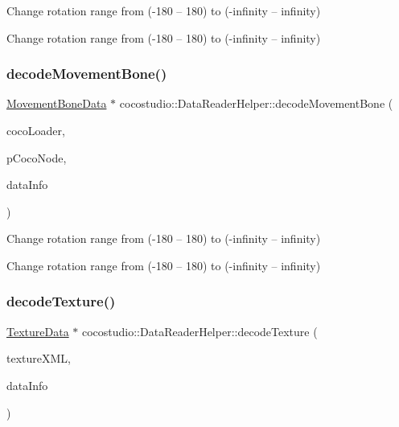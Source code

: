Change rotation range from (-\/180 -- 180) to (-\/infinity -- infinity)

Change rotation range from (-\/180 -- 180) to (-\/infinity -- infinity) \mbox{\label{classcocostudio_1_1DataReaderHelper_a66a4cce95a6b7cfbc4cbf89a962829c0}} 
\subsubsection{\texorpdfstring{decode\+Movement\+Bone()}{decodeMovementBone()}\hspace{0.1cm}{\footnotesize\ttfamily [3/3]}}
{\footnotesize\ttfamily \hyperlink{classcocostudio_1_1MovementBoneData}{Movement\+Bone\+Data} $\ast$ cocostudio\+::\+Data\+Reader\+Helper\+::decode\+Movement\+Bone (\begin{DoxyParamCaption}\item[{\hyperlink{classcocostudio_1_1CocoLoader}{Coco\+Loader} $\ast$}]{coco\+Loader,  }\item[{\hyperlink{structcocostudio_1_1stExpCocoNode}{st\+Exp\+Coco\+Node} $\ast$}]{p\+Coco\+Node,  }\item[{\hyperlink{structcocostudio_1_1DataReaderHelper_1_1__DataInfo}{Data\+Info} $\ast$}]{data\+Info }\end{DoxyParamCaption})\hspace{0.3cm}{\ttfamily [static]}}

Change rotation range from (-\/180 -- 180) to (-\/infinity -- infinity)

Change rotation range from (-\/180 -- 180) to (-\/infinity -- infinity) \mbox{\label{classcocostudio_1_1DataReaderHelper_a31a65a518dc66f8bb9145c0a3ad615af}} 
\subsubsection{\texorpdfstring{decode\+Texture()}{decodeTexture()}\hspace{0.1cm}{\footnotesize\ttfamily [1/2]}}
{\footnotesize\ttfamily \hyperlink{classcocostudio_1_1TextureData}{Texture\+Data} $\ast$ cocostudio\+::\+Data\+Reader\+Helper\+::decode\+Texture (\begin{DoxyParamCaption}\item[{\hyperlink{classtinyxml2_1_1XMLElement}{tinyxml2\+::\+X\+M\+L\+Element} $\ast$}]{texture\+X\+ML,  }\item[{\hyperlink{structcocostudio_1_1DataReaderHelper_1_1__DataInfo}{Data\+Info} $\ast$}]{data\+Info }\end{DoxyParamCaption})\hspace{0.3cm}{\ttfamily [static]}}

